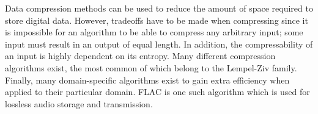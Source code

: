 \documentclass[12pt]{article}
\begin{document}
Data compression methods can be used to reduce the amount of space
required to store digital data. However, tradeoffs have to be made
when compressing since it is impossible for an algorithm to be able to
compress any arbitrary input; some input must result in an output of
equal length. In addition, the compressability of an input is highly
dependent on its entropy. Many different compression algorithms exist,
the most common of which belong to the Lempel-Ziv family. Finally,
many domain-specific algorithms exist to gain extra efficiency when
applied to their particular domain. FLAC is one such algorithm which
is used for lossless audio storage and transmission.



\end{document}
